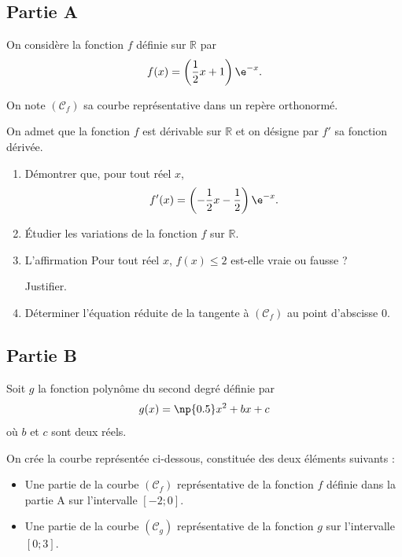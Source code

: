 \subsection*{Partie A}

On considère la fonction $f$ définie sur $\mathbb{R}$ par
\[f(x)=\left(\dfrac12 x + 1\right) \e^{-x}.\]

On note \mbox{$(\mathcal{C}_f)$} sa courbe représentative dans un repère orthonormé.

On admet que la fonction $f$ est dérivable sur $\mathbb{R}$ et on désigne par $f'$ sa fonction dérivée.

\begin{enumerate}
	\item Démontrer que, pour tout réel $x$,
	\[f'(x)=\left(-\dfrac12 x -\dfrac12\right) \e^{-x}.\]

	\item Étudier les variations de la fonction $f$ sur $\mathbb{R}$.

	\item L'affirmation \og{}Pour tout réel $x$, \mbox{$f(x)\leqslant 2$}\fg{} est-elle vraie ou fausse ?

	Justifier.
	\item Déterminer l'équation réduite de la tangente à \mbox{$(\mathcal{C}_f)$} au point d'abscisse 0.
\end{enumerate}
	\begin{center}
	\end{center}

\subsection*{Partie B}

Soit $g$ la fonction polynôme du second degré définie par
\[g(x)=\np{0.5}x^2+bx+c\]
où $b$ et $c$ sont deux réels.

On crée la courbe représentée ci-dessous, constituée des deux éléments suivants :
\begin{itemize}[label=$\bullet$]
	\item Une partie de la courbe \mbox{$(\mathcal{C}_f)$} représentative de la fonction $f$ définie dans la partie A sur l'intervalle \mbox{$[-2;0]$}.

	\item Une partie de la courbe \mbox{$(\mathcal{C}_g)$} représentative de la fonction $g$  sur l'intervalle \mbox{$[0;3]$}.
\end{itemize}

